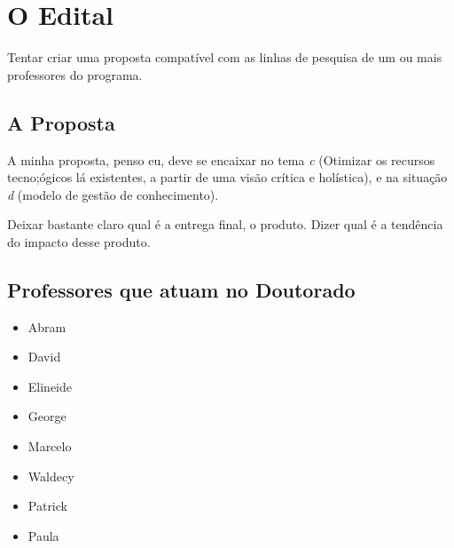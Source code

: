 \section{O Edital}
    Tentar criar uma proposta compatível com as linhas de pesquisa de um ou mais professores do programa.

    \subsection{A Proposta}
        A minha proposta, penso eu, deve se encaixar no tema \emph{c} (Otimizar os recursos tecno;ógicos lá existentes, a partir de uma visão crítica e holística), e na situação \emph{d} (modelo de gestão de conhecimento).

        Deixar bastante claro qual é a entrega final, o produto. Dizer qual é a tendência do impacto desse produto.

    \subsection{Professores que atuam no Doutorado}
        \begin{itemize}
            \item Abram 
            \item David
            \item Elineide
            \item George
            \item Marcelo
            \item Waldecy
            \item Patrick
            \item Paula
        \end{itemize}
